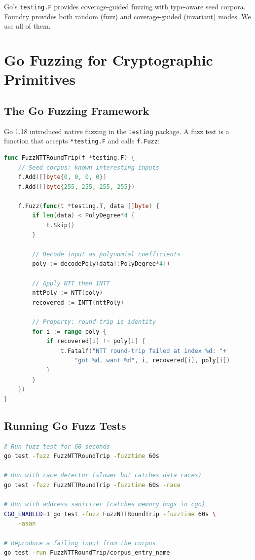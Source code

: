 \documentclass[11pt,a4paper]{article}
\begin{document}
Go's \texttt{testing.F} provides coverage-guided fuzzing with type-aware seed corpora.
Foundry provides both random (fuzz) and coverage-guided (invariant) modes. We use all
of them.

\section{Go Fuzzing for Cryptographic Primitives}

\subsection{The Go Fuzzing Framework}

Go 1.18 introduced native fuzzing in the \texttt{testing} package. A fuzz test is a
function that accepts \texttt{*testing.F} and calls \texttt{f.Fuzz}:

\begin{lstlisting}[language=Go,caption={Basic Go fuzz test for NTT round-trip}]
func FuzzNTTRoundTrip(f *testing.F) {
    // Seed corpus: known interesting inputs
    f.Add([]byte{0, 0, 0, 0})
    f.Add([]byte{255, 255, 255, 255})

    f.Fuzz(func(t *testing.T, data []byte) {
        if len(data) < PolyDegree*4 {
            t.Skip()
        }

        // Decode input as polynomial coefficients
        poly := decodePoly(data[:PolyDegree*4])

        // Apply NTT then INTT
        nttPoly := NTT(poly)
        recovered := INTT(nttPoly)

        // Property: round-trip is identity
        for i := range poly {
            if recovered[i] != poly[i] {
                t.Fatalf("NTT round-trip failed at index %d: "+
                    "got %d, want %d", i, recovered[i], poly[i])
            }
        }
    })
}
\end{lstlisting}

\subsection{Running Go Fuzz Tests}

\begin{lstlisting}[language=bash,caption={Running Go fuzz tests}]
# Run fuzz test for 60 seconds
go test -fuzz FuzzNTTRoundTrip -fuzztime 60s

# Run with race detector (slower but catches data races)
go test -fuzz FuzzNTTRoundTrip -fuzztime 60s -race

# Run with address sanitizer (catches memory bugs in cgo)
CGO_ENABLED=1 go test -fuzz FuzzNTTRoundTrip -fuzztime 60s \
    -asan

# Reproduce a failing input from the corpus
go test -run FuzzNTTRoundTrip/corpus_entry_name
\end{lstlisting}
\end{document}
